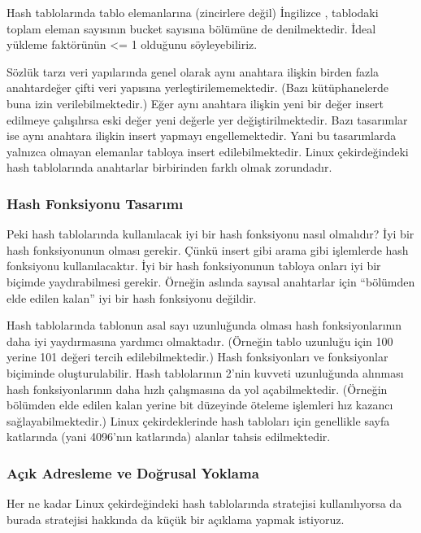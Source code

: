 \documentclass[a4paper,10pt,turkish]{sphinxmanual}
\begin{document}
\sphinxAtStartPar
Hash tablolarında tablo elemanlarına (zincirlere değil) İngilizce ,
tablodaki toplam eleman sayısının bucket sayısına bölümüne de  denilmektedir. İdeal yükleme faktörünün \textless{}= 1 olduğunu söyleyebiliriz.

\sphinxAtStartPar
Sözlük tarzı veri yapılarında genel olarak aynı anahtara ilişkin birden fazla anahtar\sphinxhyphen{}değer
çifti veri yapısına yerleştirilememektedir. (Bazı kütüphanelerde buna izin verilebilmektedir.)
Eğer aynı anahtara ilişkin yeni bir değer insert edilmeye çalışılırsa eski değer yeni
değerle yer değiştirilmektedir. Bazı tasarımlar ise aynı anahtara ilişkin insert yapmayı
engellemektedir. Yani bu tasarımlarda yalnızca olmayan elemanlar tabloya insert
edilebilmektedir. Linux çekirdeğindeki hash tablolarında anahtarlar birbirinden farklı olmak
zorundadır.


\subsubsection{Hash Fonksiyonu Tasarımı}
\label{\detokenize{kernellinkedlistandhashtable:hash-fonksiyonu-tasarimi}}
\sphinxAtStartPar
Peki hash tablolarında kullanılacak iyi bir hash fonksiyonu nasıl olmalıdır? İyi bir hash
fonksiyonunun  olması gerekir. Çünkü insert gibi arama gibi işlemlerde hash
fonksiyonu kullanılacaktır. İyi bir hash fonksiyonunun  tabloya
onları iyi bir biçimde yaydırabilmesi gerekir. Örneğin aslında sayısal anahtarlar için
“bölümden elde edilen kalan” iyi bir hash fonksiyonu değildir.

\sphinxAtStartPar
Hash tablolarında tablonun asal sayı uzunluğunda olması hash fonksiyonlarının daha iyi
yaydırmasına yardımcı olmaktadır. (Örneğin tablo uzunluğu için 100 yerine 101 değeri tercih
edilebilmektedir.) Hash fonksiyonları  ve  fonksiyonlar biçiminde oluşturulabilir. Hash tablolarının 2’nin kuvveti
uzunluğunda alınması hash fonksiyonlarının daha hızlı çalışmasına da yol açabilmektedir.
(Örneğin bölümden elde edilen kalan yerine bit düzeyinde öteleme işlemleri hız kazancı
sağlayabilmektedir.) Linux çekirdeklerinde hash tabloları için genellikle sayfa katlarında
(yani 4096’nın katlarında) alanlar tahsis edilmektedir.


\subsubsection{Açık Adresleme ve Doğrusal Yoklama}
\label{\detokenize{kernellinkedlistandhashtable:acik-adresleme-ve-dogrusal-yoklama}}
\sphinxAtStartPar
Her ne kadar Linux çekirdeğindeki hash tablolarında  stratejisi kullanılıyorsa da burada  stratejisi
hakkında da küçük bir açıklama yapmak istiyoruz.
\end{document}
